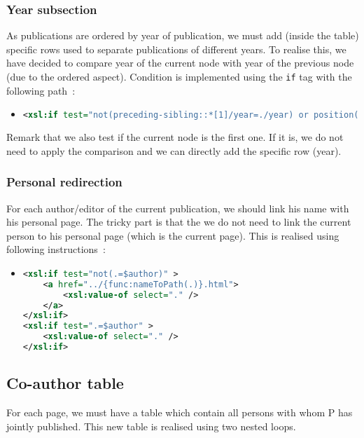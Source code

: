 \documentclass{article}
\begin{document}
    \subsubsection{Year subsection}
      As publications are ordered by year of publication, we must add (inside the table) specific rows used to separate publications of different years. To realise this, we have decided to compare year of the current node with year of the previous node (due to the ordered aspect). Condition is implemented using the \verb|if| tag with the following path~:
      \begin{itemize}
	\item \begin{lstlisting}[language=XML]
<xsl:if test="not(preceding-sibling::*[1]/year=./year) or position()=1">\end{lstlisting}
      \end{itemize}
      Remark that we also test if the current node is the first one. If it is, we do not need to apply the comparison and we can directly add the specific row (year).
      
    \subsubsection{Personal redirection}
      For each author/editor of the current publication, we should link his name with his personal page. The tricky part is that the we do not need to link the current person to his personal page (which is the current page). This is realised using following instructions~:
      \begin{itemize}
	\item \begin{lstlisting}[language=XML]
<xsl:if test="not(.=$author)" >
    <a href="../{func:nameToPath(.)}.html">
        <xsl:value-of select="." />
    </a>
</xsl:if>
<xsl:if test=".=$author" >
    <xsl:value-of select="." />
</xsl:if>\end{lstlisting}
      \end{itemize}

  \subsection{Co-author table}
    For each page, we must have a table which contain all persons with whom P has jointly published. This new table is realised using two nested loops.
\end{document}
